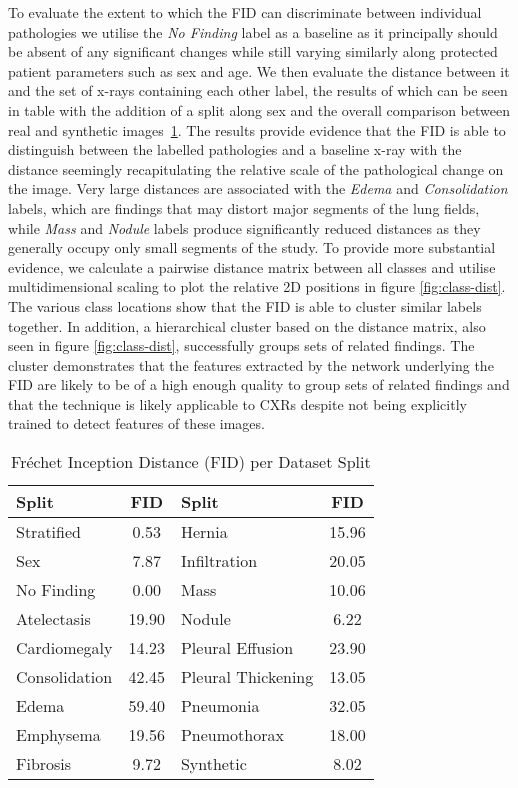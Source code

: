\documentclass{article}
\begin{document}
To evaluate the extent to which the FID can discriminate between individual pathologies we utilise the \emph{No Finding} label as a baseline as it principally should be absent of any significant changes while still varying similarly along protected patient parameters such as sex and age. We then evaluate the distance between it and the set of x-rays containing each other label, the results of which can be seen in table with the addition of a split along sex and the overall comparison between real and synthetic images~\ref{table:FIDs}. The results provide evidence that the FID is able to distinguish between the labelled pathologies and a baseline x-ray with the distance seemingly recapitulating the relative scale of the pathological change on the image. Very large distances are associated with the \emph{Edema} and \emph{Consolidation} labels, which are findings that may distort major segments of the lung fields, while \emph{Mass} and \emph{Nodule} labels produce significantly reduced distances as they generally occupy only small segments of the study. To provide more substantial evidence,  we calculate a pairwise distance matrix between all classes and utilise multidimensional scaling to plot the relative 2D positions in figure \ref{fig:class-dist}. The various class locations show that the FID is able to cluster similar labels together. In addition, a hierarchical cluster based on the distance matrix, also seen in figure \ref{fig:class-dist}, successfully groups sets of related findings. The cluster demonstrates that the features extracted by the network underlying the FID are likely to be of a high enough quality to group sets of related findings and that the technique is likely applicable to CXRs despite not being explicitly trained to detect features of these images.

\begin{table}[ht]
\centering \caption{Fréchet Inception Distance (FID) per Dataset Split} \begin{tabular}{l c l c} \hline\hline Split & FID & Split & FID\\ [0.5ex] \hline Stratified & 0.53 & Hernia & 15.96 \\
Sex & 7.87 & Infiltration & 20.05 \\
No Finding & 0.00 & Mass & 10.06 \\
Atelectasis & 19.90 & Nodule & 6.22 \\
Cardiomegaly & 14.23 & Pleural Effusion & 23.90 \\
Consolidation & 42.45 & Pleural Thickening & 13.05 \\
Edema & 59.40 & Pneumonia & 32.05 \\
Emphysema & 19.56 & Pneumothorax & 18.00 \\
Fibrosis & 9.72 & Synthetic & 8.02\\ [1ex] \hline \end{tabular}
\label{table:FIDs} 
\end{table}
\end{document}

